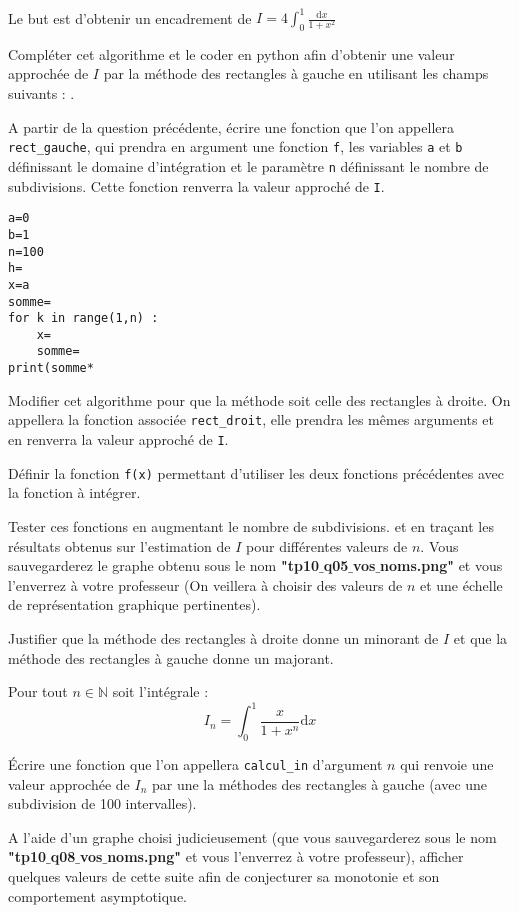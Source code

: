 \exer{[INT-002]}
\setcounter{numques}{0}~\\


Le but est d'obtenir un encadrement de
\quad $\displaystyle I=4\int_0^1\frac{\text{d}x}{1+x^2}$

\question{}
Compléter cet algorithme et le coder en python afin d'obtenir une valeur approchée de $I$ par la méthode des rectangles à gauche en utilisant les champs suivants : 
.

\question{} A partir de la question précédente, écrire une fonction que l'on appellera \texttt{rect\_gauche}, qui prendra en argument une fonction \texttt{f}, les variables \texttt{a} et \texttt{b} définissant le domaine d'intégration et le paramètre \texttt{n} définissant le nombre de subdivisions. Cette fonction renverra la valeur approché de \texttt{I}.
\begin{lstlisting}
a=0
b=1
n=100
h=
x=a
somme=
for k in range(1,n) :
    x=
    somme=
print(somme*
\end{lstlisting}

\question{}
Modifier cet algorithme pour que la méthode soit celle des rectangles à droite. On appellera la fonction associée \texttt{rect\_droit}, elle prendra les mêmes arguments et en renverra la valeur approché de \texttt{I}.

\question{} Définir la fonction \texttt{f(x)} permettant d'utiliser les deux fonctions précédentes avec la fonction à intégrer. 


\question{}
Tester ces fonctions en augmentant le nombre de subdivisions. et en traçant les résultats obtenus sur l'estimation de $I$ pour différentes valeurs de $n$. Vous sauvegarderez le graphe obtenu sous le nom \textbf{"tp10$\_$q05$\_$vos$\_$noms.png"} et vous l'enverrez à votre professeur (On veillera à choisir des valeurs de $n$ et une échelle de représentation graphique pertinentes).



\question{}
Justifier que la méthode des rectangles à droite donne un minorant de $I$ et que la méthode des rectangles à gauche donne un majorant. 

Pour tout $n\in\mathbb{N}$ soit l'intégrale : 
$$I_n=\int_0^1\frac{x}{1+x^n} \text{d}x$$

\question{} Écrire une fonction que l'on appellera \texttt{calcul\_in} d'argument $n$ qui renvoie une valeur approchée de $I_n$ par une la méthodes des rectangles à gauche (avec une subdivision de 100 intervalles).

\question{} A l'aide d'un graphe choisi judicieusement (que vous sauvegarderez sous le nom \textbf{"tp10$\_$q08$\_$vos$\_$noms.png"} et vous l'enverrez à votre professeur), afficher quelques valeurs de cette suite afin de conjecturer sa monotonie et son comportement asymptotique.